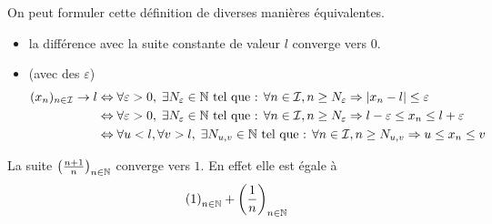 \begin{rems}
On peut formuler cette définition de diverses manières équivalentes.
 \begin{itemize}
 \item la différence avec la suite constante de valeur $l$ converge vers 0.
 \item (avec des $\varepsilon$)
\begin{align*}
(x_n)_{n\in \mathcal I} \rightarrow l
&\Leftrightarrow \forall \varepsilon >0, \; \exists N_\varepsilon \in \mathbb{N} \text{ tel que : } \forall n\in \mathcal I, n\geq N_\varepsilon  \Rightarrow |x_n -l| \leq \varepsilon \\
&\Leftrightarrow \forall \varepsilon >0, \; \exists N_\varepsilon \in \mathbb{N} \text{ tel que : } \forall n\in \mathcal I, n\geq N_\varepsilon  \Rightarrow l-\varepsilon \leq x_n \leq l+\varepsilon \\
&\Leftrightarrow \forall u < l , \forall v > l, \; \exists N_{u,v}\in \mathbb{N} \text{ tel que : } \forall n\in \mathcal I, n\geq N_{u,v} \Rightarrow u \leq x_n \leq v
\end{align*}
\end{itemize}
\end{rems}
\begin{exple}
 La suite $\left(\frac{n+1}{n}\right)_{n\in\mathbb{N}}$ converge vers $1$. En effet elle est égale à 
\begin{displaymath}
 \left(1\right)_{n\in\mathbb{N}} + \left(\frac{1}{n}\right)_{n\in\mathbb{N}}
\end{displaymath}
\end{exple}

